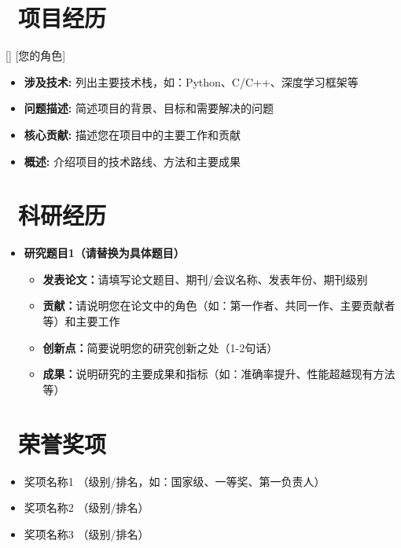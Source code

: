 \documentclass{resume}
\begin{document}
\section{{\color{darkeraccent}\faWrench~项目经历}}

[]
[您的角色]
\begin{itemize}
	\item \textbf{涉及技术:} 列出主要技术栈，如：Python、C/C++、深度学习框架等
	\item \textbf{问题描述:} 简述项目的背景、目标和需要解决的问题
	\item \textbf{核心贡献:} 描述您在项目中的主要工作和贡献
	\item \textbf{概述:} 介绍项目的技术路线、方法和主要成果
\end{itemize}

\section{{\color{darkeraccent}\faBrain~科研经历}}

\begin{itemize}
	\item \textbf{研究题目1（请替换为具体题目）}
	\begin{itemize}[label=$\triangleright$]
		\item \textbf{发表论文：}请填写论文题目、期刊/会议名称、发表年份、期刊级别
		\item \textbf{贡献：}请说明您在论文中的角色（如：第一作者、共同一作、主要贡献者等）和主要工作
		\item \textbf{创新点：}简要说明您的研究创新之处（1-2句话）
		\item \textbf{成果：}说明研究的主要成果和指标（如：准确率提升、性能超越现有方法等）
	\end{itemize}
\end{itemize}

\section{{\color{darkeraccent}\faMedal~荣誉奖项}}
\begin{itemize}
	\item 奖项名称1 \; （级别/排名，如：国家级、一等奖、第一负责人）
	\item 奖项名称2 \; （级别/排名）
	\item 奖项名称3 \; （级别/排名）
\end{itemize}
\end{document}
